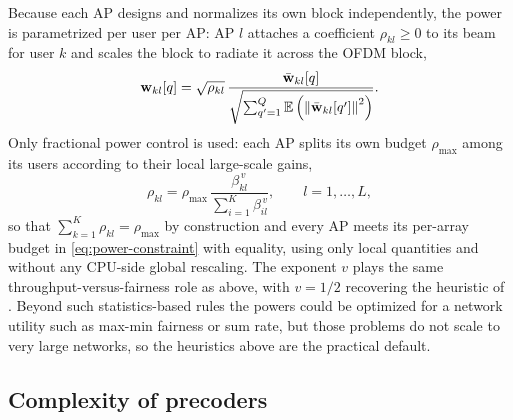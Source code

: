 Because each AP designs and normalizes its own block independently, the power is
parametrized per user per AP: AP $l$ attaches a coefficient $\rho_{kl}\geq 0$ to
its beam for user $k$ and scales the block to radiate it across the OFDM block,
\begin{equation}
\boldsymbol{\mathrm{w}}_{kl}[q]=\sqrt{\rho_{kl}}\,
\frac{\bar{\boldsymbol{\mathrm{w}}}_{kl}[q]}
{\sqrt{\sum_{q'=1}^{Q}\mathbb{E}\left(\left\lVert\bar{\boldsymbol{\mathrm{w}}}_{kl}[q']\right\rVert^{2}\right)}}.
\end{equation}
Only fractional power control is used: each AP splits its own budget
$\rho_{\max}$ among its users according to their local large-scale gains,
\begin{equation}
\label{eq:fractional-power}
\rho_{kl} = \rho_{\max}\,
\frac{\beta_{kl}^{\,v}}{\sum_{i=1}^{K}\beta_{il}^{\,v}},
\qquad l=1,\dots,L,
\end{equation}
so that $\sum_{k=1}^{K}\rho_{kl}=\rho_{\max}$ by construction and every AP meets
its per-array budget in \eqref{eq:power-constraint} with equality, using only
local quantities and without any CPU-side global rescaling. The exponent
$v$ plays the same throughput-versus-fairness role as above, with
$v=1/2$ recovering the heuristic of \cite{demir2021foundations}. Beyond
such statistics-based rules the powers could be optimized for a network utility
such as max-min fairness or sum rate, but those problems do not scale to very
large networks, so the heuristics above are the practical default.

\subsection{Complexity of precoders}
